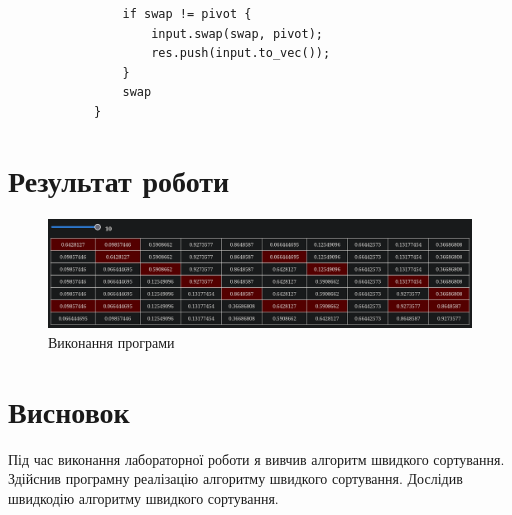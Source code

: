 \documentclass{article}
\begin{document}
\begin{normalsize}
\begin{lstlisting}
				if swap != pivot {
					input.swap(swap, pivot);
					res.push(input.to_vec());
				}
				swap
			}
\end{lstlisting}
		
		\section*{Результат роботи}
		\begin{figure}[H]
			\centering
			\includegraphics[scale=0.36]{1}
			\caption{Виконання програми}
		\end{figure}
		
		\section*{Висновок}
		Під час виконання лабораторної роботи я вивчив алгоритм швидкого сортування. Здійснив програмну реалізацію алгоритму швидкого сортування. Дослідив швидкодію алгоритму швидкого сортування.
		
	\end{normalsize}
\end{document}
